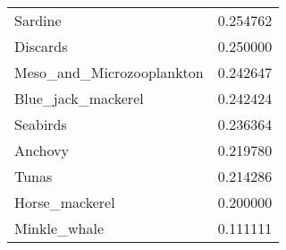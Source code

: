 \begin{tabular}{lr}
                         Sardine &                0.254762 \\
                        Discards &                0.250000 \\
       Meso\_and\_Microzooplankton &                0.242647 \\
              Blue\_jack\_mackerel &                0.242424 \\
                        Seabirds &                0.236364 \\
                         Anchovy &                0.219780 \\
                           Tunas &                0.214286 \\
                  Horse\_mackerel &                0.200000 \\
                    Minkle\_whale &                0.111111 \\
\bottomrule
\end{tabular}
